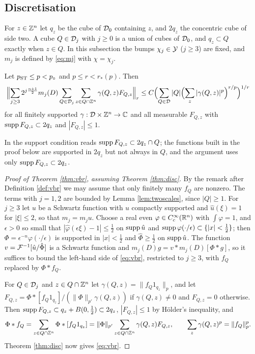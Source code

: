 \subsection{Discretisation}\label{ssec:disc}
For $z\in\mathbb{Z}^n$ let $q_z$ be the cube of $\mathcal D_0$ containing $z$, and $2q_z$ the concentric cube of side two.
A cube $Q\in\mathcal D_j$ with $j\ge0$ is a union of cubes of $\mathcal D_0$, and $q_z\subset Q$ exactly when $z\in Q$. In
this subsection the bumps $\chi_j\in\mathcal Y$ ($j\ge3$) are fixed, and $m_j$ is defined by \eqref{eq:mj} with
$\chi=\chi_j$.

\begin{theorem}\label{thm:disc}
Let $p_{\rm ST}\le p<p_\circ$ and $p\le r<r_*(p)$. Then
\begin{equation}\label{eq:disc}
\Bigl\|\sum_{j\ge3}2^{j\frac{n+1}2}m_j(D)\sum_{Q\in\mathcal D_j}\sum_{z\in Q\cap\mathbb{Z}^n}\gamma(Q,z)F_{Q,z}\Bigr\|_r
\le C\Bigl(\sum_{Q\in\mathcal D}|Q|\Bigl(\sum_z|\gamma(Q,z)|^p\Bigr)^{r/p}\Bigr)^{1/r}
\end{equation}
for all finitely supported $\gamma:\mathcal D\times\mathbb{Z}^n\to\mathbb{C}$ and all measurable $F_{Q,z}$ with
$\operatorname{supp} F_{Q,z}\subset2q_z$ and $|F_{Q,z}|\le1$.
\end{theorem}

In \cite[(4.1)]{BRS23} the support condition reads $\operatorname{supp} F_{Q,z}\subset2q_z\cap Q$; the functions built in
the proof below are supported in $2q_z$ but not always in $Q$, and the argument uses only
$\operatorname{supp} F_{Q,z}\subset2q_z$.

\begin{proof}[Proof of Theorem \ref{thm:vbr}, assuming Theorem \ref{thm:disc}]
By the remark after Definition \ref{def:vbr} we may assume that only finitely many $f_Q$ are nonzero.
The terms with $j=1,2$ are bounded by Lemma \ref{lem:twoscales}, since $|Q|\ge1$. For $j\ge3$ let $u$ be a
Schwartz function with $\hat u$ compactly supported and $\hat u(\xi)=1$ for $|\xi|\le2$, so that
$m_j=m_j\hat u$. Choose a real even $\varphi\in C^\infty_c(\mathbb{R}^n)$ with $\int\varphi=1$, and $\epsilon>0$ so
small that $|\hat\varphi(\epsilon\xi)-1|\le\frac12$ on $\operatorname{supp}\hat u$ and $\operatorname{supp}\varphi(\cdot/\epsilon)\subset\{|x|<\frac12\}$;
then $\Phi=\epsilon^{-n}\varphi(\cdot/\epsilon)$ is supported in $|x|<\frac12$ and $\hat\Phi\ge\frac12$ on $\operatorname{supp}\hat u$.
The function $v=\mathcal F^{-1}[\hat u/\hat\Phi]$ is a Schwartz function and $m_j(D)g=v*m_j(D)[\Phi*g]$, so it
suffices to bound the left-hand side of \eqref{eq:vbr}, restricted to $j\ge3$, with $f_Q$ replaced by
$\Phi*f_Q$.

For $Q\in\mathcal D_j$ and $z\in Q\cap\mathbb{Z}^n$ let $\gamma(Q,z)=\|f_Q1_{q_z}\|_p$, and let
$F_{Q,z}=\Phi*[f_Q1_{q_z}]/(\|\Phi\|_{p'}\gamma(Q,z))$ if $\gamma(Q,z)\ne0$ and $F_{Q,z}=0$ otherwise. Then
$\operatorname{supp} F_{Q,z}\subset q_z+B(0,\frac12)\subset2q_z$, $|F_{Q,z}|\le1$ by H\"older's inequality, and
\[
\Phi*f_Q=\sum_{z\in Q\cap\mathbb{Z}^n}\Phi*[f_Q1_{q_z}]=\|\Phi\|_{p'}\sum_{z\in Q\cap\mathbb{Z}^n}\gamma(Q,z)F_{Q,z},\qquad
\sum_z\gamma(Q,z)^p=\|f_Q\|_p^p .
\]
Theorem \ref{thm:disc} now gives \eqref{eq:vbr}.
\end{proof}

